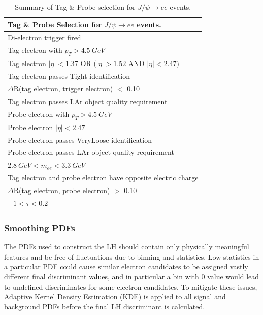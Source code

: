 \begin{table}[h]
\footnotesize
\renewcommand{\arraystretch}{1.3}
\begin{center}
\begin{tabular}{l}
\textbf{Tag \& Probe Selection for $J/\psi\rightarrow ee$ events.} \\
\hline
Di-electron trigger fired\\
\midrule
Tag electron with $p_T > 4.5~GeV$ \\
    Tag electron $|\eta| < 1.37$ OR $(|\eta| > 1.52$ AND $|\eta| < 2.47)$ \\
	    Tag electron passes Tight identification \\
	    $\Delta$R(tag electron, trigger electron) $<$ 0.10 \\
	    Tag electron passes LAr object quality requirement \\
	\midrule
    Probe electron with $p_T > 4.5~GeV$ \\
	    Probe electron $|\eta| < 2.47$ \\
	    Probe electron passes VeryLoose identification \\
	    Probe electron passes LAr object quality requirement \\
	\midrule
	    $2.8~GeV < m_{ee} < 3.3~GeV$ \\
	    Tag electron and probe electron have opposite electric charge \\
	    $\Delta$R(tag electron, probe electron) $>$ 0.10 \\
	    $-1 < \tau < 0.2$\\
	\hline
\end{tabular}
\end{center}
\caption{Summary of Tag \& Probe selection for $J/\psi\rightarrow ee$ events.}
\label{tab:tp_J}
\end{table}

\subsubsection{Smoothing PDFs}
The PDFs used to construct the LH should contain only physically meaningful features and be free of fluctuations due to binning and statistics. Low statistics in a particular PDF could cause similar electron candidates to be assigned vastly different final discriminant values, and in particular a bin with 0 value would lead to undefined discriminates for some electron candidates. To mitigate these issues, Adaptive Kernel Density Estimation (KDE) is applied to all signal and background PDFs before the final LH discriminant is calculated. \\

